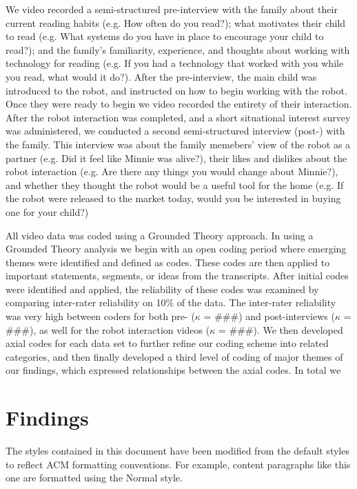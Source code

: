 \documentclass{sigchi}
\begin{document}
  We video recorded a semi-structured pre-interview with the family about their current reading habits (e.g. How often do you read?); what motivates their child to read (e.g. What systems do you have in place to encourage your child to read?); and the family's familiarity, experience, and thoughts about working with technology for reading (e.g. If you had a technology that worked with you while you read, what would it do?). After the pre-interview, the main child was introduced to the robot, and instructed on how to begin working with the robot.  Once they were ready to begin we video recorded the entirety of their interaction. After the robot interaction was completed, and a short situational interest survey was administered, we conducted a second semi-structured interview (post-) with the family.  This interview was about the family memebers' view of the robot as a partner (e.g. Did it feel like Minnie was alive?), their likes and dislikes about the robot interaction (e.g. Are there any things you would change about Minnie?), and whether they thought the robot would be a useful tool for the home (e.g. If the robot were released to the market today, would you be interested in  buying one for your child?)
  
  All video data was coded using a Grounded Theory approach. In using a Grounded Theory analysis we begin with an open coding period where emerging themes were identified and defined as codes.  These codes are then applied to important statements, segments, or ideas from the transcripts.  After initial codes were identified and applied, the reliability of these codes was examined by comparing inter-rater reliability on 10\% of the data.  The inter-rater reliability was very high between coders for both pre- ($\kappa$ = \#\#\#) and post-interviews  ($\kappa$ = \#\#\#), as well for the robot interaction videos ($\kappa$ = \#\#\#).  We then developed axial codes for each data set to further refine our coding scheme into related categories, and then finally developed a third level of coding of major themes of our findings, which expressed relationships between the axial codes.  In total we 
 
\section{Findings}
The styles contained in this document have been modified from the
default styles to reflect ACM formatting conventions. For example,
content paragraphs like this one are formatted using the Normal style.
\end{document}
